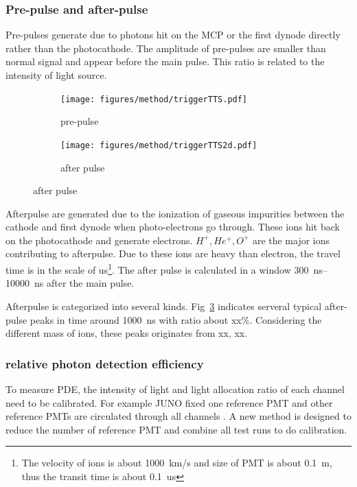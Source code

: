 \subsubsection{Pre-pulse and after-pulse}
Pre-pulses generate due to photons hit on the MCP or the first dynode directly rather than the photocathode\cite{JUNOMassTesting}. The amplitude of pre-pulses are smaller than normal signal and appear before the main pulse. This ratio is related to the intensity of light source.
\begin{figure}[!htbp]
    \centering
    \begin{subfigure}[t]{0.47\textwidth}
        \texttt{[image: figures/method/triggerTTS.pdf]}
        \caption{pre-pulse}
        \label{fig:prepulse}
    \end{subfigure}
    \begin{subfigure}[t]{0.47\textwidth}
        \texttt{[image: figures/method/triggerTTS2d.pdf]}
        \caption{after pulse}
        \label{fig:afterpulse}
    \end{subfigure}
\end{figure}
Afterpulse are generated due to the ionization of gaseous impurities between the cathode and first dynode when photo-electrons go through\cite{Coates_1973}. These ions hit back on the photocathode and generate electrons. $H^+,He^+,O^+$ are the major ions contributing to afterpulse\cite{Coates_1973}. Due to these ions are heavy than electron, the travel time is in the scale of \si{us}\footnote{The velocity of ions is about \SI{1000}{km/s} and size of PMT is about \SI{0.1}{m}, thus the transit time is about \SI{0.1}{us}}. The after pulse is calculated in a window \SIrange{300}{10000}{ns} after the main pulse.


Afterpulse is categorized into several kinds. Fig~\ref{fig:afterpulse} indicates serveral typical after-pulse peaks in time around \SI{1000}{ns} with ratio about xx\%. Considering the different mass of ions, these peaks originates from xx, xx.

\subsubsection{relative photon detection efficiency}
To measure PDE, the intensity of light and light allocation ratio of each channel need to be calibrated. For example JUNO fixed one reference PMT and other reference PMTs are circulated through all channels \cite{Wonsak_2021}. A new method is designed to reduce the number of reference PMT and combine all test runs to do calibration.  

